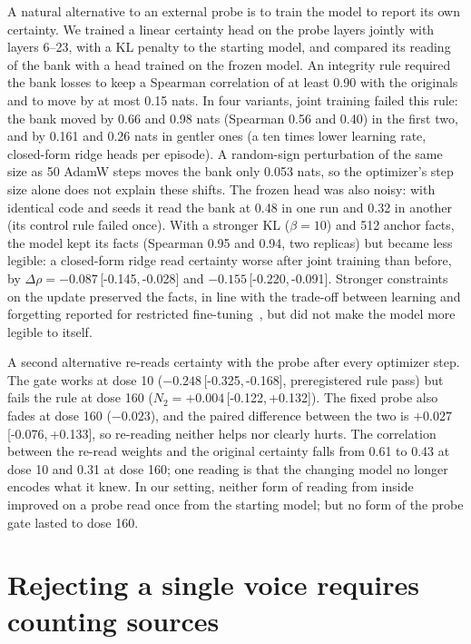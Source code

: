 \documentclass[11pt]{article}
\newcommand{\NTwo}{\ensuremath{N_2}}
\newcommand{\ci}[2]{\,[#1,\,#2]}
\begin{document}
A natural alternative to an external probe is to train the model to report its own certainty.
We trained a linear certainty head on the probe layers jointly with layers 6--23, with a KL penalty to the starting model, and compared its reading of the bank with a head trained on the frozen model.
An integrity rule required the bank losses to keep a Spearman correlation of at least 0.90 with the originals and to move by at most 0.15 nats.
In four variants, joint training failed this rule: the bank moved by 0.66 and 0.98 nats (Spearman 0.56 and 0.40) in the first two, and by 0.161 and 0.26 nats in gentler ones (a ten times lower learning rate, closed-form ridge heads per episode).
A random-sign perturbation of the same size as 50 AdamW steps moves the bank only 0.053 nats, so the optimizer's step size alone does not explain these shifts.
The frozen head was also noisy: with identical code and seeds it read the bank at 0.48 in one run and 0.32 in another (its control rule failed once).
With a stronger KL ($\beta=10$) and 512 anchor facts, the model kept its facts (Spearman 0.95 and 0.94, two replicas) but became less legible: a closed-form ridge read certainty worse after joint training than before, by $\Delta\rho=-0.087$\ci{-0.145}{-0.028} and $-0.155$\ci{-0.220}{-0.091}.
Stronger constraints on the update preserved the facts, in line with the trade-off between learning and forgetting reported for restricted fine-tuning~\citep{biderman2024lora}, but did not make the model more legible to itself.

A second alternative re-reads certainty with the probe after every optimizer step.
The gate works at dose 10 ($-0.248$\ci{-0.325}{-0.168}, preregistered rule pass) but fails the rule at dose 160 ($\NTwo=+0.004$\ci{-0.122}{+0.132}).
The fixed probe also fades at dose 160 ($-0.023$), and the paired difference between the two is $+0.027$\ci{-0.076}{+0.133}, so re-reading neither helps nor clearly hurts.
The correlation between the re-read weights and the original certainty falls from 0.61 to 0.43 at dose 10 and 0.31 at dose 160; one reading is that the changing model no longer encodes what it knew.
In our setting, neither form of reading from inside improved on a probe read once from the starting model; but no form of the probe gate lasted to dose 160.

\section{Rejecting a single voice requires counting sources}
\label{sec:sources}
\end{document}
